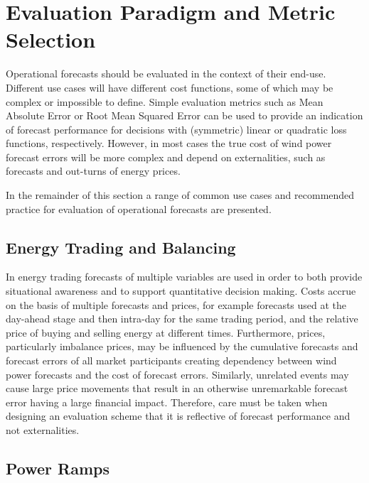 \section{Evaluation Paradigm and Metric Selection}

Operational forecasts should be evaluated in the context of their end-use. Different use cases will have different cost functions, some of which may be complex or impossible to define. Simple evaluation metrics such as Mean Absolute Error or Root Mean Squared Error can be used to provide an indication of forecast performance for decisions with (symmetric) linear or quadratic loss functions, respectively. However, in most cases the true cost of wind power forecast errors will be more complex and depend on externalities, such as forecasts and out-turns of energy prices.

In the remainder of this section a range of common use cases and recommended practice for evaluation of operational forecasts are presented. 

\subsection{Energy Trading and Balancing}
%
In energy trading forecasts of multiple variables are used in order to both provide situational awareness and to support quantitative decision making. Costs accrue on the basis of multiple forecasts and prices, for example forecasts used at the day-ahead stage and then intra-day for the same trading period, and the relative price of buying and selling energy at different times. Furthermore, prices, particularly imbalance prices, may be influenced by the cumulative forecasts and forecast errors of all market participants creating dependency between wind power forecasts and the cost of forecast errors. Similarly, unrelated events may cause large price movements that result in an otherwise unremarkable forecast error having a large financial impact. Therefore, care must be taken when designing an evaluation scheme that it is reflective of forecast performance and not externalities.





\subsection{Power Ramps}

